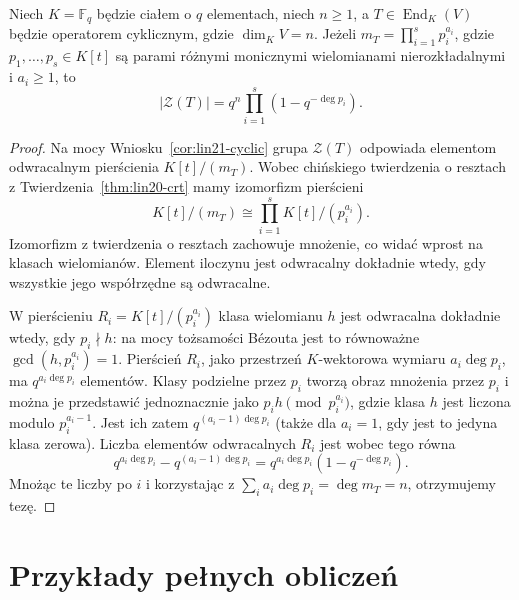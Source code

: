 \begin{stwierdzenie}
\label{prop:lin21-finite-units}
Niech \(K=\mathbb F_q\) będzie
ciałem o \(q\) elementach,
niech \(n\ge1\), a
\(T\in\operatorname{End}_K(V)\)
będzie operatorem cyklicznym,
gdzie \(\dim_K V=n\).
Jeżeli
\(m_T=\prod_{i=1}^{s}p_i^{a_i}\),
gdzie \(p_1,\ldots,p_s\in K[t]\)
są parami różnymi monicznymi
wielomianami nierozkładalnymi
i \(a_i\ge1\), to
\[
 |\mathcal Z(T)|
 =q^n\prod_{i=1}^{s}
       \left(1-q^{-\deg p_i}\right).
\]
\end{stwierdzenie}
\begin{proof}
Na mocy Wniosku~\ref{cor:lin21-cyclic}
grupa \(\mathcal Z(T)\)
odpowiada elementom odwracalnym
pierścienia \(K[t]/(m_T)\).
Wobec chińskiego twierdzenia
o resztach z
Twierdzenia~\ref{thm:lin20-crt}
mamy izomorfizm pierścieni
\[
 K[t]/(m_T)\cong
 \prod_{i=1}^{s}K[t]/(p_i^{a_i}).
\]
Izomorfizm z twierdzenia o resztach
zachowuje mnożenie,
co widać wprost na klasach wielomianów.
Element iloczynu jest odwracalny
dokładnie wtedy, gdy wszystkie
jego współrzędne są odwracalne.

W pierścieniu \(R_i=K[t]/(p_i^{a_i})\)
klasa wielomianu \(h\) jest odwracalna
dokładnie wtedy, gdy \(p_i\nmid h\):
na mocy tożsamości Bézouta
jest to równoważne
\(\gcd(h,p_i^{a_i})=1\).
Pierścień \(R_i\), jako
przestrzeń \(K\)-wektorowa wymiaru
\(a_i\deg p_i\), ma
\(q^{a_i\deg p_i}\) elementów.
Klasy podzielne przez \(p_i\)
tworzą obraz mnożenia przez \(p_i\)
i można je przedstawić jednoznacznie
jako \(p_i h\pmod {p_i^{a_i}}\),
gdzie klasa \(h\) jest liczona
modulo \(p_i^{a_i-1}\).
Jest ich zatem
\(q^{(a_i-1)\deg p_i}\)
(także dla \(a_i=1\), gdy jest
to jedyna klasa zerowa).
Liczba elementów odwracalnych \(R_i\)
jest wobec tego równa
\[
 q^{a_i\deg p_i}
 -q^{(a_i-1)\deg p_i}
 =q^{a_i\deg p_i}
     \left(1-q^{-\deg p_i}\right).
\]
Mnożąc te liczby po \(i\)
i korzystając z
\(\sum_i a_i\deg p_i=\deg m_T=n\),
otrzymujemy tezę.
\end{proof}

\section{Przykłady pełnych obliczeń}
\label{sec:lin21-examples}

